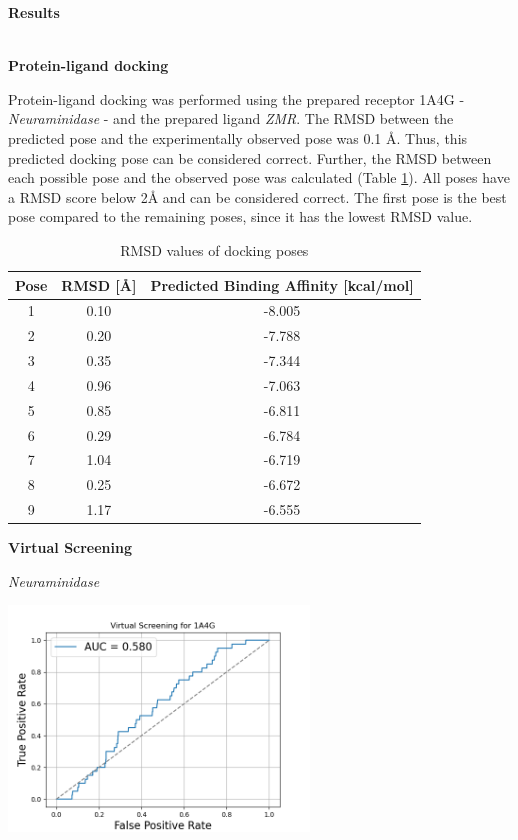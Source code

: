\documentclass[a4paper,10pt]{article}
\begin{document}
\begin{large}
	\vspace{0.5cm}
	\textbf{Results}
\end{large}	\\ [1mm]

\textbf{Protein-ligand docking}

Protein-ligand docking was performed using the prepared receptor 1A4G - \textit{Neuraminidase} - and the prepared ligand \textit{ZMR}. The RMSD between the predicted pose and the experimentally observed pose was 0.1 Å. Thus, this predicted docking pose can be considered correct. Further, the RMSD between each possible pose and the observed pose was calculated (Table \ref{tab:rmsd}). All poses have a RMSD score below 2Å and can be considered correct. The first pose is the best pose compared to the remaining poses, since it has the lowest RMSD value.


\begin{table}[h!]
\centering
\caption{RMSD values of docking poses}
\label{tab:rmsd}
\begin{tabular}{|c|c|c|}
\hline
\textbf{Pose} & \textbf{RMSD [\AA]} & \textbf{Predicted Binding Affinity [kcal/mol]} \\
\hline
1 & 0.10 & -8.005\\
2 & 0.20 & -7.788\\
3 & 0.35 & -7.344\\
4 & 0.96 & -7.063\\
5 & 0.85 & -6.811\\
6 & 0.29 & -6.784 \\
7 & 1.04 & -6.719 \\
8 & 0.25 & -6.672\\
9 & 1.17 & -6.555 \\
\hline
\end{tabular}
\end{table}


\textbf{Virtual Screening}

\textit{Neuraminidase} 
\begin{center}
\includegraphics[width=8cm]{figures/ROC.png}
\end{center}
\end{document}
